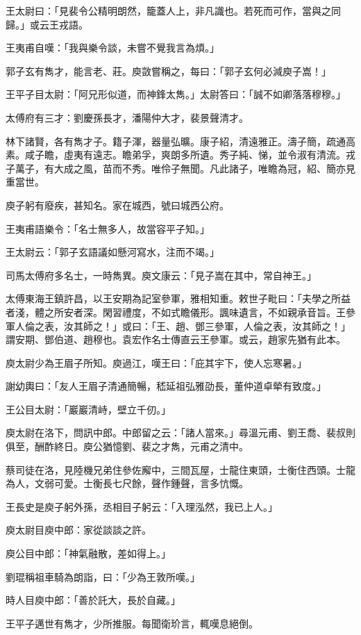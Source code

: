 王太尉曰：「見裴令公精明朗然，籠蓋人上，非凡識也。若死而可作，當與之同歸。」或云王戎語。

王夷甫自嘆：「我與樂令談，未嘗不覺我言為煩。」

郭子玄有雋才，能言老、莊。庾敳嘗稱之，每曰：「郭子玄何必減庾子嵩！」

王平子目太尉：「阿兄形似道，而神鋒太雋。」太尉答曰：「誠不如卿落落穆穆。」

太傅府有三才：劉慶孫長才，潘陽仲大才，裴景聲清才。

林下諸賢，各有雋才子。籍子渾，器量弘曠。康子紹，清遠雅正。濤子簡，疏通高素。咸子瞻，虛夷有遠志。瞻弟孚，爽朗多所遺。秀子純、悌，並令淑有清流。戎子萬子，有大成之風，苗而不秀。唯伶子無聞。凡此諸子，唯瞻為冠，紹、簡亦見重當世。

庾子躬有廢疾，甚知名。家在城西，號曰城西公府。

王夷甫語樂令：「名士無多人，故當容平子知。」

王太尉云：「郭子玄語議如懸河寫水，注而不竭。」

司馬太傅府多名士，一時雋異。庾文康云：「見子嵩在其中，常自神王。」

太傅東海王鎮許昌，以王安期為記室參軍，雅相知重。敕世子毗曰：「夫學之所益者淺，體之所安者深。閑習禮度，不如式瞻儀形。諷味遺言，不如親承音旨。王參軍人倫之表，汝其師之！」或曰：「王、趙、鄧三參軍，人倫之表，汝其師之！」謂安期、鄧伯道、趙穆也。袁宏作名士傳直云王參軍。或云，趙家先猶有此本。

庾太尉少為王眉子所知。庾過江，嘆王曰：「庇其宇下，使人忘寒暑。」

謝幼輿曰：「友人王眉子清通簡暢，嵇延祖弘雅劭長，董仲道卓犖有致度。」

王公目太尉：「巖巖清峙，壁立千仞。」

庾太尉在洛下，問訊中郎。中郎留之云：「諸人當來。」尋溫元甫、劉王喬、裴叔則俱至，酬酢終日。庾公猶憶劉、裴之才雋，元甫之清中。

蔡司徒在洛，見陸機兄弟住參佐廨中，三間瓦屋，士龍住東頭，士衡住西頭。士龍為人，文弱可愛。士衡長七尺餘，聲作鍾聲，言多忼慨。

王長史是庾子躬外孫，丞相目子躬云：「入理泓然，我已上人。」

庾太尉目庾中郎：家從談談之許。

庾公目中郎：「神氣融散，差如得上。」

劉琨稱祖車騎為朗詣，曰：「少為王敦所嘆。」

時人目庾中郎：「善於託大，長於自藏。」

王平子邁世有雋才，少所推服。每聞衛玠言，輒嘆息絕倒。

